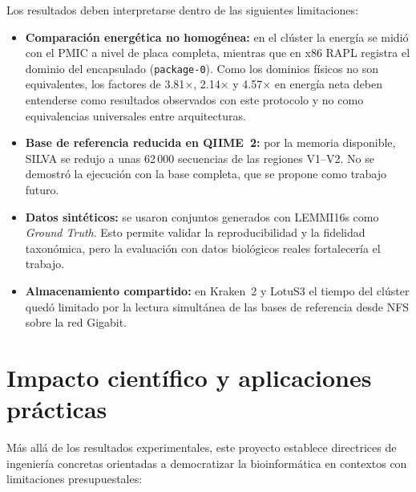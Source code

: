 \documentclass[12pt,oneside,spanish]{book}
\begin{document}
    Los resultados deben interpretarse dentro de las siguientes limitaciones:

    \begin{itemize}
        \item \textbf{Comparación energética no homogénea:} en el clúster la energía se midió con el PMIC a nivel de placa completa, mientras que en x86 RAPL registra el dominio del encapsulado (\texttt{package-0}). Como los dominios físicos no son equivalentes, los factores de 3.81$\times$, 2.14$\times$ y 4.57$\times$ en energía neta deben entenderse como resultados observados con este protocolo y no como equivalencias universales entre arquitecturas.

        \item \textbf{Base de referencia reducida en QIIME~2:} por la memoria disponible, SILVA se redujo a unas 62\,000 secuencias de las regiones V1--V2. No se demostró la ejecución con la base completa, que se propone como trabajo futuro.

        \item \textbf{Datos sintéticos:} se usaron conjuntos generados con LEMMI16s como \textit{Ground Truth}. Esto permite validar la reproducibilidad y la fidelidad taxonómica, pero la evaluación con datos biológicos reales fortalecería el trabajo.

        \item \textbf{Almacenamiento compartido:} en Kraken~2 y LotuS3 el tiempo del clúster quedó limitado por la lectura simultánea de las bases de referencia desde NFS sobre la red Gigabit.
    \end{itemize}

    \section{Impacto científico y aplicaciones prácticas}
    Más allá de los resultados experimentales, este proyecto establece directrices de ingeniería concretas orientadas a democratizar la bioinformática en contextos con limitaciones presupuestales:
    
\end{document}
